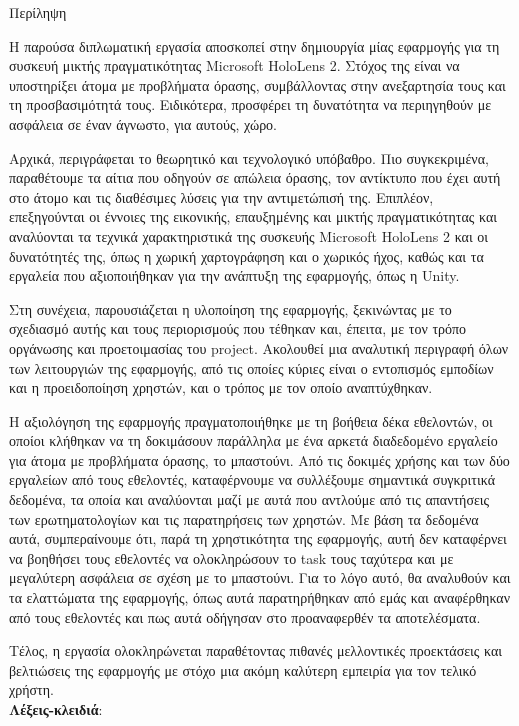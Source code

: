 \pagestyle{plain}
\begin{center}
{\LARGE Περίληψη}\\[1cm]
\end{center}

\setlength{\parindent}{0pt}
Η παρούσα διπλωματική εργασία αποσκοπεί στην δημιουργία μίας εφαρμογής για τη συσκευή μικτής πραγματικότητας Microsoft HoloLens 2. Στόχος της είναι να υποστηρίξει άτομα με προβλήματα όρασης, συμβάλλοντας στην ανεξαρτησία τους και τη προσβασιμότητά τους. Ειδικότερα, προσφέρει τη δυνατότητα να περιηγηθούν με ασφάλεια σε έναν άγνωστο, για αυτούς, χώρο.

Αρχικά, περιγράφεται το θεωρητικό και τεχνολογικό υπόβαθρο. Πιο συγκεκριμένα, παραθέτουμε τα αίτια που οδηγούν σε απώλεια όρασης, τον αντίκτυπο που έχει αυτή στο άτομο και τις διαθέσιμες λύσεις για την αντιμετώπισή της. Επιπλέον, επεξηγούνται οι έννοιες της εικονικής, επαυξημένης και μικτής πραγματικότητας και αναλύονται τα τεχνικά χαρακτηριστικά της συσκευής Microsoft HoloLens 2 και οι δυνατότητές της, όπως η χωρική χαρτογράφηση και ο χωρικός ήχος, καθώς και τα εργαλεία που αξιοποιήθηκαν για την ανάπτυξη της εφαρμογής, όπως η Unity.

Στη συνέχεια, παρουσιάζεται η υλοποίηση της εφαρμογής, ξεκινώντας με το σχεδιασμό αυτής και τους περιορισμούς που τέθηκαν και, έπειτα, με τον τρόπο οργάνωσης και προετοιμασίας του project. Ακολουθεί μια αναλυτική περιγραφή όλων των λειτουργιών της εφαρμογής, από τις οποίες κύριες είναι ο εντοπισμός εμποδίων και η προειδοποίηση χρηστών, και ο τρόπος με τον οποίο αναπτύχθηκαν.

Η αξιολόγηση της εφαρμογής πραγματοποιήθηκε με τη βοήθεια δέκα εθελοντών, οι οποίοι κλήθηκαν να τη δοκιμάσουν παράλληλα με ένα αρκετά διαδεδομένο εργαλείο για άτομα με προβλήματα όρασης, το μπαστούνι. Από τις δοκιμές χρήσης και των δύο εργαλείων από τους εθελοντές, καταφέρνουμε να συλλέξουμε σημαντικά συγκριτικά δεδομένα, τα οποία και αναλύονται μαζί με αυτά που αντλούμε από τις απαντήσεις των ερωτηματολογίων και τις παρατηρήσεις των χρηστών. Με βάση τα δεδομένα αυτά, συμπεραίνουμε ότι, παρά τη χρηστικότητα της εφαρμογής, αυτή δεν καταφέρνει να βοηθήσει τους εθελοντές να ολοκληρώσουν το task τους ταχύτερα και με μεγαλύτερη ασφάλεια σε σχέση με το μπαστούνι. Για το λόγο αυτό, θα αναλυθούν και τα ελαττώματα της εφαρμογής, όπως αυτά παρατηρήθηκαν από εμάς και αναφέρθηκαν από τους εθελοντές και πως αυτά οδήγησαν στο προαναφερθέν τα αποτελέσματα.

Τέλος, η εργασία ολοκληρώνεται παραθέτοντας πιθανές μελλοντικές προεκτάσεις και βελτιώσεις της εφαρμογής με στόχο μια ακόμη καλύτερη εμπειρία για τον τελικό χρήστη.
\\[\baselineskip]
\textbf{Λέξεις-κλειδιά}: {\keywords}